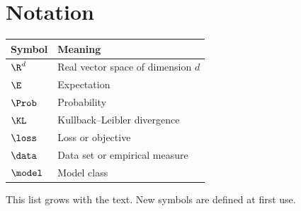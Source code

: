 \chapter{Notation}
\label{ch:notation}

\begin{center}
\begin{tabular}{ll}
\toprule
Symbol & Meaning \\
\midrule
$\R^d$ & Real vector space of dimension $d$ \\
$\E$ & Expectation \\
$\Prob$ & Probability \\
$\KL$ & Kullback--Leibler divergence \\
$\loss$ & Loss or objective \\
$\data$ & Data set or empirical measure \\
$\model$ & Model class \\
\bottomrule
\end{tabular}
\end{center}

This list grows with the text. New symbols are defined at first use.
